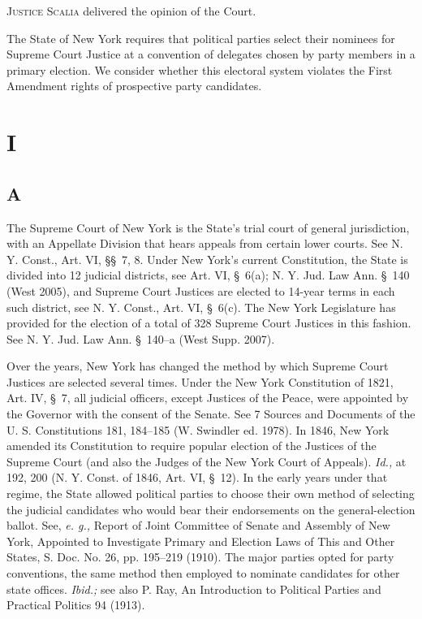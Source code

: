 
\setcounter{page}{198}

  \textsc{Justice Scalia} delivered the opinion of the Court.

  The State of New York requires that political parties select their nominees for Supreme Court Justice at a convention of delegates chosen by party members in a primary election. We consider whether this electoral system violates the First Amendment rights of prospective party candidates.

\section{I}

\subsection{A}

  The Supreme Court of New York is the State's trial court of general jurisdiction, with an Appellate Division that hears appeals from certain lower courts. See N. Y. Const., Art. \newpage  VI, \S\S~7, 8. Under New York's current Constitution, the State is divided into 12 judicial districts, see Art. VI, \S~6(a); N. Y. Jud. Law Ann. \S~140 (West 2005), and Supreme Court Justices are elected to 14-year terms in each such district, see N. Y. Const., Art. VI, \S~6(c). The New York Legislature has provided for the election of a total of 328 Supreme Court Justices in this fashion. See N. Y. Jud. Law Ann. \S~140--a (West Supp. 2007).

  Over the years, New York has changed the method by which Supreme Court Justices are selected several times. Under the New York Constitution of 1821, Art. IV, \S~7, all judicial officers, except Justices of the Peace, were appointed by the Governor with the consent of the Senate. See 7 Sources and Documents of the U. S. Constitutions 181, 184--185 (W. Swindler ed. 1978). In 1846, New York amended its Constitution to require popular election of the Justices of the Supreme Court (and also the Judges of the New York Court of Appeals). \emph{Id.,} at 192, 200 (N. Y. Const. of 1846, Art. VI, \S~12). In the early years under that regime, the State allowed political parties to choose their own method of selecting the judicial candidates who would bear their endorsements on the general-election ballot. See, \emph{e. g.,} Report of Joint Committee of Senate and Assembly of New York, Appointed to Investigate Primary and Election Laws of This and Other States, S. Doc. No. 26, pp. 195--219 (1910). The major parties opted for party conventions, the same method then employed to nominate candidates for other state offices. \emph{Ibid.;} see also P. Ray, An Introduction to Political Parties and Practical Politics 94 (1913).

